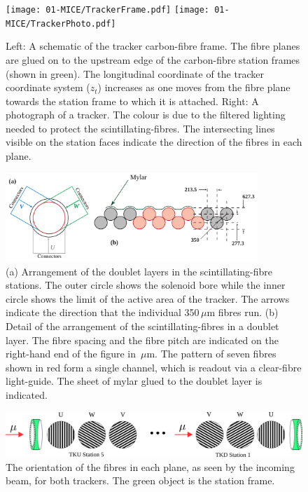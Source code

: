   \begin{figure}[tb]
    \centering
    \texttt{[image: 01-MICE/TrackerFrame.pdf]} \hspace{2pc}%
    \texttt{[image: 01-MICE/TrackerPhoto.pdf]}
    \caption{\label{fig:Trackers} Left: A schematic of the tracker carbon-fibre frame.  The fibre planes are glued on to the upstream edge of the carbon-fibre station frames (shown in green). The longitudinal coordinate of the tracker coordinate system ($z_t$) increases as one moves from the fibre plane towards the station frame to which it is attached.  Right: A photograph of a tracker. The colour is due to the filtered lighting needed to protect the scintillating-fibres. The intersecting lines visible on the station faces indicate the direction of the fibres in each plane.}
  \end{figure}

  \begin{figure}[tb]
    \begin{center}
      \includegraphics[width=0.85\textwidth]{01-MICE/doublet-layer.pdf}
      \caption{\label{fig:DoubletLayer}(a) Arrangement of the doublet layers in the scintillating-fibre  stations. The outer circle shows the solenoid bore while the inner circle shows the limit of the active area of the tracker. The arrows indicate the direction that the individual 350\,$\mu$m fibres run. (b) Detail of the arrangement of the scintillating-fibres in a doublet layer. The fibre spacing and the fibre pitch are indicated on the right-hand end of the figure in \,$\mu$m. The pattern of seven fibres shown in red form a single channel, which is readout via a clear-fibre light-guide. The sheet of mylar glued to the doublet layer is indicated. }
    \end{center}
  \end{figure}

  \begin{figure}[tb]
    \centering
    \includegraphics[width=0.95\linewidth]{01-MICE/FibrePlaneOrientation.pdf} \hspace{2pc}%
    \caption{\label{fig:FibrePlaneOrientation} The orientation of the fibres in each plane, as seen by the incoming beam, for both trackers. The green object is the station frame.}
  \end{figure}